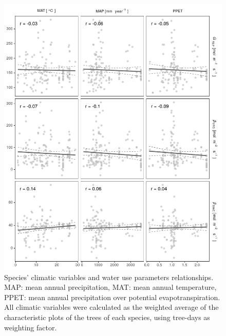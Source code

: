 \documentclass[11pt,twoside]{reedthesis}
\begin{document}
\begin{figure}[H]

{\centering \includegraphics[width=1\linewidth]{figure/appendixD/fig22} 

}

\caption[Species' climatic variables and water use parameters relationships.]{Species' climatic variables and water use parameters relationships. MAP: mean annual precipitation, MAT: mean annual temperature, PPET: mean annual precipitation over potential evapotranspiration. All climatic variables were calculated as the weighted average of the characteristic plots of the trees of each species, using tree-days as weighting factor.}\label{fig:climateparamplot}
\end{figure}
\end{document}

